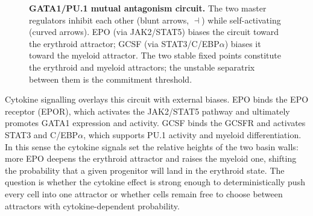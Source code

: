 \begin{figure}[ht]
\centering
{}
\caption{\textbf{GATA1/PU.1 mutual antagonism circuit.} The two master regulators inhibit each other (blunt arrows, $\dashv$) while self-activating (curved arrows). EPO (via JAK2/STAT5) biases the circuit toward the erythroid attractor; GCSF (via STAT3/C/EBP$\alpha$) biases it toward the myeloid attractor. The two stable fixed points constitute the erythroid and myeloid attractors; the unstable separatrix between them is the commitment threshold.}
\label{fig:circuit}
\end{figure}
Cytokine signalling overlays this circuit with external biases. EPO binds the EPO receptor (EPOR), which activates the JAK2/STAT5 pathway and ultimately promotes GATA1 expression and activity. GCSF binds the GCSFR and activates STAT3 and C/EBP$\alpha$, which supports PU.1 activity and myeloid differentiation. In this sense the cytokine signals set the relative heights of the two basin walls: more EPO deepens the erythroid attractor and raises the myeloid one, shifting the probability that a given progenitor will land in the erythroid state. The question is whether the cytokine effect is strong enough to deterministically push every cell into one attractor or whether cells remain free to choose between attractors with cytokine-dependent probability.

